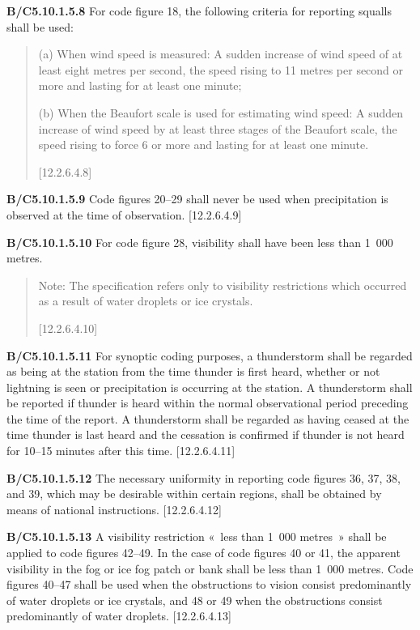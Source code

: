 \textbf{B/C5.10.1.5.8} For code figure 18, the following criteria for reporting squalls shall be used:

\begin{quote}
(a) When wind speed is measured: A sudden increase of wind speed of at least eight metres per second, the speed rising to 11 metres per second or more and lasting for at least one minute;

(b) When the Beaufort scale is used for estimating wind speed: A sudden increase of wind speed by at least three stages of the Beaufort scale, the speed rising to force 6 or more and lasting for at least one minute.

{[}12.2.6.4.8{]}
\end{quote}

\textbf{B/C5.10.1.5.9} Code figures 20--29 shall never be used when precipitation is observed at the time of observation. {[}12.2.6.4.9{]}

\textbf{B/C5.10.1.5.10} For code figure 28, visibility shall have been less than 1~000 metres.

\begin{quote}
Note: The specification refers only to visibility restrictions which occurred as a result of water droplets or ice crystals.

{[}12.2.6.4.10{]}
\end{quote}

\textbf{B/C5.10.1.5.11} For synoptic coding purposes, a thunderstorm shall be regarded as being at the station from the time thunder is first heard, whether or not lightning is seen or precipitation is occurring at the station. A thunderstorm shall be reported if thunder is heard within the normal observational period preceding the time of the report. A thunderstorm shall be regarded as having ceased at the time thunder is last heard and the cessation is confirmed if thunder is not heard for 10--15 minutes after this time. {[}12.2.6.4.11{]}

\textbf{B/C5.10.1.5.12} The necessary uniformity in reporting code figures 36, 37, 38, and 39, which may be desirable within certain regions, shall be obtained by means of national instructions. {[}12.2.6.4.12{]}

\textbf{B/C5.10.1.5.13} A visibility restriction «~less than 1~000 metres~» shall be applied to code figures 42--49. In the case of code figures 40 or 41, the apparent visibility in the fog or ice fog patch or bank shall be less than 1~000 metres. Code figures 40--47 shall be used when the obstructions to vision consist predominantly of water droplets or ice crystals, and 48 or 49 when the obstructions consist predominantly of water droplets. {[}12.2.6.4.13{]}

